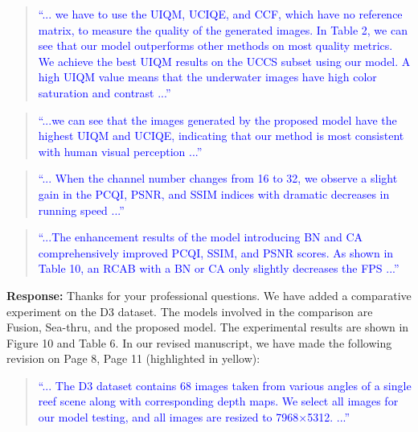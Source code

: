 \documentclass[a4paper,twoside,10pt]{reviewresponse}
\newcommand\tgray[1]{\textcolor{blue}{#1}}
\begin{document}
\begin{quotation}
	\tgray{
		``... we have to use the UIQM, UCIQE, and CCF, which have no reference matrix, to measure the quality of the generated images. In Table 2, we can see that our model outperforms other methods on most quality metrics. We achieve the best UIQM results on the UCCS subset using our model. A high UIQM value means that the underwater images have high color saturation and contrast ...''
}
\end{quotation}

\begin{quotation}
	\tgray{
		``...we can see that the images generated by the proposed model have the highest UIQM and UCIQE, indicating that our method is most consistent with human visual perception  ...''
}
\end{quotation}

\begin{quotation}
	\tgray{
		``... When the channel number changes from 16 to 32, we observe a slight gain in the PCQI, PSNR, and SSIM indices with dramatic decreases in running speed ...''
}
\end{quotation}

\begin{quotation}
	\tgray{
		``...The enhancement results of the model introducing BN and CA comprehensively improved PCQI, SSIM, and PSNR scores. As shown in Table 10, an RCAB with a BN or CA only slightly decreases the FPS  ...''
}
\end{quotation}


\textbf{Response:} 
Thanks for your professional questions. We have added a comparative experiment on the D3 dataset. The models involved in the comparison are Fusion, Sea-thru, and the proposed model. The experimental results are shown in Figure 10 and Table 6. In our revised manuscript, we have made the following revision on Page 8, Page 11 (highlighted in yellow):
\begin{quotation}
	\tgray{
		``... The D3 dataset contains 68 images taken from various angles of a single reef scene along with corresponding depth maps. We select all images for our model testing, and all images are resized to 7968$\times$5312. ...''
}
\end{quotation}
\end{document}
